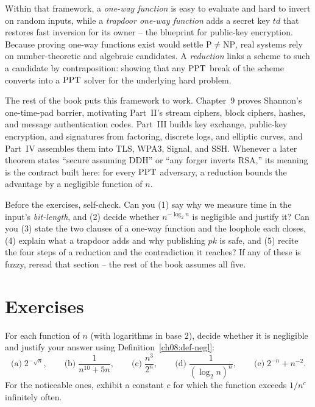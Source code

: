 Within that framework, a \emph{one-way function} is easy to evaluate and hard to invert on random inputs, while a \emph{trapdoor one-way function} adds a secret key $td$ that restores fast inversion for its owner -- the blueprint for public-key encryption. Because proving one-way functions exist would settle $\mathrm{P} \ne \mathrm{NP}$, real systems rely on number-theoretic and algebraic candidates. A \emph{reduction} links a scheme to such a candidate by contraposition: showing that any $\mathrm{PPT}$ break of the scheme converts into a $\mathrm{PPT}$ solver for the underlying hard problem.

The rest of the book puts this framework to work. Chapter~9 proves Shannon's one-time-pad barrier, motivating Part~II's stream ciphers, block ciphers, hashes, and message authentication codes. Part~III builds key exchange, public-key encryption, and signatures from factoring, discrete logs, and elliptic curves, and Part~IV assembles them into TLS, WPA3, Signal, and SSH. Whenever a later theorem states ``secure assuming DDH'' or ``any forger inverts RSA,'' its meaning is the contract built here: for every $\mathrm{PPT}$ adversary, a reduction bounds the advantage by a negligible function of $n$.

\begin{recoverybox}
Before the exercises, self-check. Can you (1) say why we measure time in the input's \emph{bit-length}, and (2) decide whether $n^{-\log_2 n}$ is negligible and justify it? Can you (3) state the two clauses of a one-way function and the loophole each closes, (4) explain what a trapdoor adds and why publishing $pk$ is safe, and (5) recite the four steps of a reduction and the contradiction it reaches? If any of these is fuzzy, reread that section -- the rest of the book assumes all five.
\end{recoverybox}

\section{Exercises}
\label{ch08:exercises}

\begin{exercise}
\label{ch08:ex-1}
For each function of $n$ (with logarithms in base $2$), decide whether it is negligible and justify your answer using Definition~\ref{ch08:def-negl}:
\[
\text{(a)}\; 2^{-\sqrt{n}}, \qquad
\text{(b)}\; \frac{1}{n^{10}+5n}, \qquad
\text{(c)}\; \frac{n^{3}}{2^{n}}, \qquad
\text{(d)}\; \frac{1}{(\log_2 n)^{n}}, \qquad
\text{(e)}\; 2^{-n} + n^{-2}.
\]
For the noticeable ones, exhibit a constant $c$ for which the function exceeds $1/n^{c}$ infinitely often.
\end{exercise}


